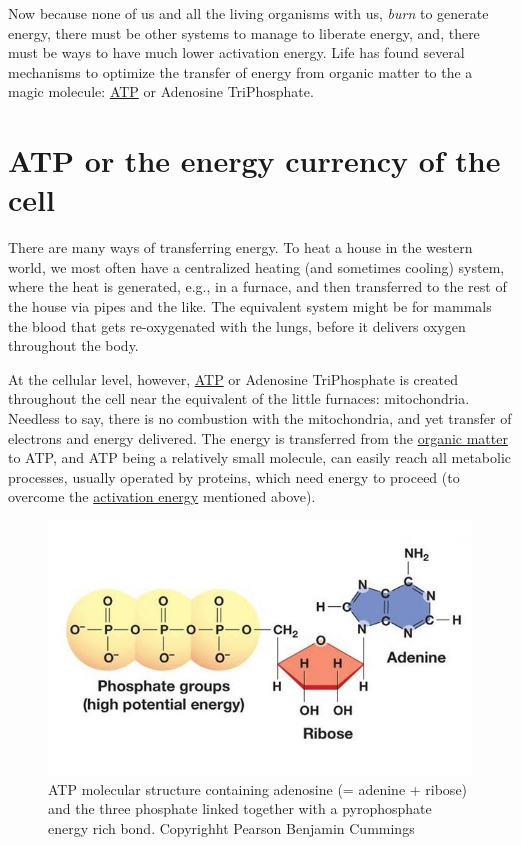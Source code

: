 \documentclass[]{book}
\theoremstyle{definition}
\theoremstyle{definition}
\theoremstyle{definition}
\theoremstyle{remark}
\begin{document}
Now because none of us and all the living organisms with us, \emph{burn}
to generate energy, there must be other systems to manage to liberate
energy, and, there must be ways to have much lower activation energy.
Life has found several mechanisms to optimize the transfer of energy
from organic matter to the a magic molecule:
\protect\hyperlink{ATP}{ATP} or Adenosine TriPhosphate.

\hypertarget{ATP}{\section{ATP or the energy currency of the
cell}\label{ATP}}

There are many ways of transferring energy. To heat a house in the
western world, we most often have a centralized heating (and sometimes
cooling) system, where the heat is generated, e.g., in a furnace, and
then transferred to the rest of the house via pipes and the like. The
equivalent system might be for mammals the blood that gets re-oxygenated
with the lungs, before it delivers oxygen throughout the body.

At the cellular level, however, \protect\hyperlink{ATP}{ATP} or
Adenosine TriPhosphate is created throughout the cell near the
equivalent of the little furnaces: mitochondria. Needless to say, there
is no combustion with the mitochondria, and yet transfer of electrons
and energy delivered. The energy is transferred from the
\protect\hyperlink{OM}{organic matter} to ATP, and ATP being a
relatively small molecule, can easily reach all metabolic processes,
usually operated by proteins, which need energy to proceed (to overcome
the \href{https://en.wikipedia.org/wiki/Activation_energy}{activation
energy} mentioned above).

\begin{figure}

{\centering \includegraphics[width=0.7\linewidth]{pictures/atp02a} 

}

\caption{ATP molecular structure containing adenosine (= adenine + ribose) and the three phosphate linked together with a pyrophosphate energy rich bond. Copyrighht Pearson Benjamin Cummings}\label{fig:ATPstructure}
\end{figure}
\end{document}

